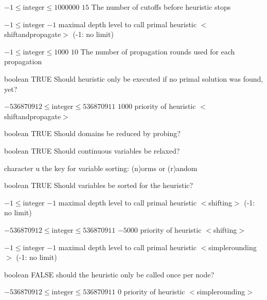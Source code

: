 %
{$-1\leq\textrm{integer}\leq1000000$}%
{$15$}%
{The number of cutoffs before heuristic stops}%
{}

%
{$-1\leq\textrm{integer}$}%
{$-1$}%
{maximal depth level to call primal heuristic $<$shiftandpropagate$>$ (-1: no limit)}%
{}

%
{$-1\leq\textrm{integer}\leq1000$}%
{$10$}%
{The number of propagation rounds used for each propagation}%
{}

%
{boolean}%
{TRUE}%
{Should heuristic only be executed if no primal solution was found, yet?}%
{}

%
{$-536870912\leq\textrm{integer}\leq536870911$}%
{$1000$}%
{priority of heuristic $<$shiftandpropagate$>$}%
{}

%
{boolean}%
{TRUE}%
{Should domains be reduced by probing?}%
{}

%
{boolean}%
{TRUE}%
{Should continuous variables be relaxed?}%
{}

%
{character}%
{u}%
{the key for variable sorting: (n)orms or (r)andom}%
{}

%
{boolean}%
{TRUE}%
{Should variables be sorted for the heuristic?}%
{}

%
{$-1\leq\textrm{integer}$}%
{$-1$}%
{maximal depth level to call primal heuristic $<$shifting$>$ (-1: no limit)}%
{}

%
{$-536870912\leq\textrm{integer}\leq536870911$}%
{$-5000$}%
{priority of heuristic $<$shifting$>$}%
{}

%
{$-1\leq\textrm{integer}$}%
{$-1$}%
{maximal depth level to call primal heuristic $<$simplerounding$>$ (-1: no limit)}%
{}

%
{boolean}%
{FALSE}%
{should the heuristic only be called once per node?}%
{}

%
{$-536870912\leq\textrm{integer}\leq536870911$}%
{$0$}%
{priority of heuristic $<$simplerounding$>$}%
{}

